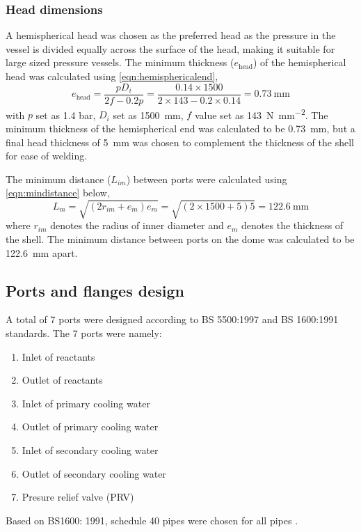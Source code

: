 \subsubsection{Head dimensions}
A hemispherical head was chosen as the preferred head as the pressure in the vessel is divided equally across the surface of the head, making it suitable for large sized pressure vessels. The minimum thickness ($e_\mathrm{head}$) of the hemispherical head was calculated using \cref{eqn:hemisphericalend},
\begin{equation}
    e_\mathrm{head} = \frac{pD_i}{2f-0.2p} = \frac{0.14 \times 1500}{2 \times 143 - 0.2 \times 0.14} = \SI{0.73}{\mm}
    \label{eqn:hemisphericalend}
\end{equation}
with $p$ set as 1.4 bar, $D_i$ set as \SI{1500}{\milli \metre}, $f$ value set as \SI{143}{\N\per\square\mm}.  The minimum thickness of the hemispherical end was calculated to be \SI{0.73}{\milli \metre}, but a final head thickness of \SI{5}{\milli \metre} was chosen to complement the thickness of the shell for ease of welding. 

The minimum distance ($L_{im}$) between ports were calculated using \cref{eqn:mindistance} below,
\begin{equation}
    L_m = \sqrt{(2r_{im}+e_{m})e_m} = \sqrt{(2 \times 1500 + 5)5} = \SI{122.6}{\mm}
    \label{eqn:mindistance}
\end{equation}
where $r_{im}$ denotes the radius of inner diameter and $e_m$ denotes the thickness of the shell. The minimum distance between ports on the dome was calculated to be \SI{122.6}{\milli \metre} apart. 

\subsection{Ports and flanges design}
A total of 7 ports were designed according to BS 5500:1997 and BS 1600:1991 standards. The 7 ports were namely:
\begin{enumerate}
    \item Inlet of reactants
    \item Outlet of reactants
    \item Inlet of primary cooling water
    \item Outlet of primary cooling water
    \item Inlet of secondary cooling water
    \item Outlet of secondary cooling water
    \item Presure relief valve (PRV)
\end{enumerate}
Based on BS1600: 1991, schedule 40 pipes were chosen for all pipes \cite{noauthor_dimensions_nodate}. 
